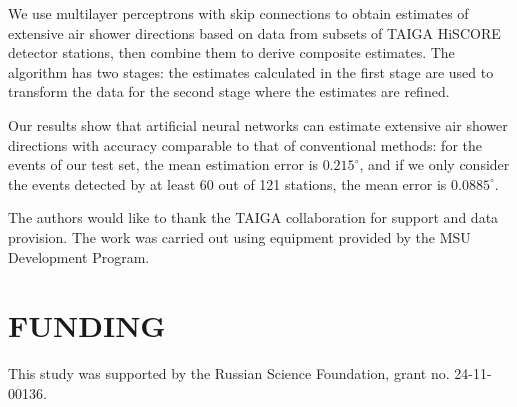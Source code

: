 \documentclass[reprint,
superscriptaddress,
amsmath,amssymb,aps,showkeys,showpacs,
twoside,final,secnumarabic,%
nofootinbib]{revtex4-2}
\begin{document}
We use multilayer perceptrons with skip connections to obtain estimates of extensive air shower directions based on data from subsets of TAIGA HiSCORE detector stations, then combine them to derive composite estimates. The algorithm has two stages: the estimates calculated in the first stage are used to transform the data for the second stage where the estimates are refined.

Our results show that artificial neural networks can estimate extensive air shower directions with accuracy comparable to that of conventional methods: for the events of our test set, the mean estimation error is $0.215^\circ$, and if we only consider the events detected by at least 60 out of 121 stations, the mean error is $0.0885^\circ$.


\begin{acknowledgments}
The authors would like to thank the TAIGA collaboration for support and
data provision. The work was carried out using equipment provided by the
MSU Development Program.
\end{acknowledgments}

\section*{FUNDING}
This study was supported by the Russian Science
Foundation, grant no. 24-11-00136.
\end{document}
